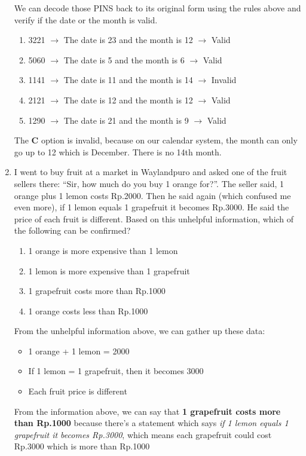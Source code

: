 \documentclass[12pt,titlepage]{article}
\begin{document}
\begin{enumerate}
{        We can decode those PINS back to its original form using the rules above and verify if the date or the month is valid.
        \begin{enumerate}[label=\Alph*.]
            \item 3221 $\rightarrow$ The date is 23 and the month is 12 $\rightarrow$ Valid
            \item 5060 $\rightarrow$ The date is 5 and the month is 6 $\rightarrow$ Valid
            \item 1141 $\rightarrow$ The date is 11 and the month is 14 $\rightarrow$ Invalid
            \item 2121 $\rightarrow$ The date is 12 and the month is 12 $\rightarrow$ Valid
            \item 1290 $\rightarrow$ The date is 21 and the month is 9 $\rightarrow$ Valid
        \end{enumerate}
        
        The \textbf{C} option is invalid, because on our calendar system, the month can only go up to 12 which is December. 
        There is no 14th month.
    }
    \item {
        I went to buy fruit at a market in Waylandpuro and asked one of the fruit sellers there: “Sir, how much do you buy 1
        orange for?”. The seller said, 1 orange plus 1 lemon costs Rp.2000. Then he said again (which confused me even more), if
        1 lemon equals 1 grapefruit it becomes Rp.3000. He said the price of each fruit is different. Based on this unhelpful
        information, which of the following can be confirmed?
        \begin{enumerate}[label=\Alph*.]
            \item 1 orange is more expensive than 1 lemon
            \item 1 lemon is more expensive than 1 grapefruit
            \item 1 grapefruit costs more than Rp.1000
            \item 1 orange costs less than Rp.1000
        \end{enumerate}
        \pagebreak
        From the unhelpful information above, we can gather up these data:
        \begin{itemize}
            \item 1 orange + 1 lemon = 2000
            \item If 1 lemon = 1 grapefruit, then it becomes 3000
            \item Each fruit price is different
        \end{itemize}

        From the information above, we can say that \textbf{1 grapefruit costs more than Rp.1000} because there's a statement which says
        \textit{if 1 lemon equals 1 grapefruit it becomes Rp.3000}, which means each grapefruit could cost Rp.3000 which is more than Rp.1000
    }
\end{enumerate}
\end{document}
